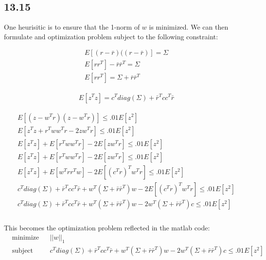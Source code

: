 \documentclass[12pt]{article}
\newenvironment{proposition}[2][Proposition]{\begin{trivlist}
\item[\hskip \labelsep {\bfseries #1}\hskip \labelsep {\bfseries #2.}]}{\end{trivlist}}
\begin{document}
\subsection*{13.15}
One heurisitic is to ensure that the 1-norm of $w$ is minimized. We can then formulate and optimization problem subject to the following constraint:
\begin{proposition}{1}
\begin{align}
E[(r-\bar{r})((r-\bar{r})] = \Sigma\\
E[rr^T] - \bar{r}\bar{r}^T = \Sigma\\
E[rr^T] = \Sigma + \bar{r}\bar{r}^T
\end{align}
\end{proposition}
\begin{proposition}{2}
\begin{align}
E[z^Tz] = c^Tdiag(\Sigma) + \bar{r}^Tcc^T\bar{r}
\end{align}
\end{proposition}
\begin{equation*}
\begin{aligned}
E[(z-w^Tr)(z-w^Tr)] \le .01E[z^2]\\
E[z^Tz + r^Tww^Tr - 2zw^Tr ] \le .01E[z^2]\\
E[z^Tz] + E[r^Tww^Tr] - 2E[zw^Tr] \le .01E[z^2]\\
E[z^Tz] + E[r^Tww^Tr] - 2E[zw^Tr] \le .01E[z^2]\\
E[z^Tz] + E[w^Trr^Tw] - 2E[(c^Tr)^Tw^Tr] \le .01E[z^2]\\
c^Tdiag(\Sigma) + \bar{r}^Tcc^T\bar{r} + w^T(\Sigma + \bar{r}\bar{r}^T)w - 2E[(c^Tr)^Tw^Tr] \le .01E[z^2]\\
c^Tdiag(\Sigma) + \bar{r}^Tcc^T\bar{r} + w^T(\Sigma + \bar{r}\bar{r}^T)w - 2w^T(\Sigma + \bar{r}\bar{r}^T)c \le .01E[z^2]\\
\end{aligned}
\end{equation*}\\
This becomes the optimization problem reflected in the matlab code:
\begin{equation*}
\begin{aligned}
& \underset{}{\text{minimize}}
& &  ||w||_1\\
& \text{subject to}\
& & c^Tdiag(\Sigma) + \bar{r}^Tcc^T\bar{r} + w^T(\Sigma + \bar{r}\bar{r}^T)w - 2w^T(\Sigma + \bar{r}\bar{r}^T)c \le .01E[z^2]\\
\end{aligned}
\end{equation*}\\
\end{document}
